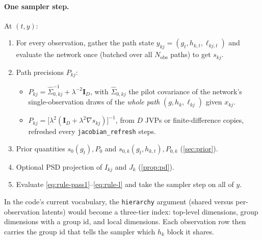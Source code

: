 \documentclass[11pt]{article}
\theoremstyle{definition}
\theoremstyle{remark}
\newcommand{\I}{\mathbf{I}}
\newcommand{\lam}{\lambda}
\newcommand{\arrowm}{\texttt{gauss\_\allowbreak hierarchical}}
\newcommand{\quiver}{\texttt{gauss\_\allowbreak jacobian}}
\newcommand{\hk}{h_k}
\newcommand{\lkj}{\ell_{kj}}
\begin{document}
\paragraph{One sampler step.} At $(t,y)$:
\begin{enumerate}
\item For every observation, gather the path state
 $y_{kj}=(g_t,h_{k,t},\ell_{kj,t})$ and evaluate the network once (batched over
 all $N_\text{obs}$ paths) to get $s_{kj}$.
\item Path precisions $P_{kj}$:
 \begin{itemize}
 \item[\arrowm:] $P_{kj}=\hat\Sigma_{0,kj}^{-1}+\lam^{-2}\I_D$, with
  $\hat\Sigma_{0,kj}$ the pilot covariance of the network's single-observation draws
  of the \emph{whole path} $(g,\hk,\lkj)$ given $x_{kj}$.
 \item[\quiver:] $P_{kj}=\big[\lam^2(\I_D+\lam^2\nabla s_{kj})\big]^{-1}$, from $D$
  JVPs or finite-difference copies, refreshed every \texttt{jacobian\_refresh} steps.
 \end{itemize}
\item Prior quantities $s_0(g_t),P_0$ and $s_{0,k}(g_t,h_{k,t}),P_{0,k}$
 (\cref{sec:prior}).
\item Optional PSD projection of $I_{kj}$ and $J_k$ (\cref{prop:pd}).
\item Evaluate \eqref{eq:rule-pass1}--\eqref{eq:rule-l} and take the sampler step on all of $y$.
\end{enumerate}
In the code's current vocabulary, the \texttt{hierarchy} argument (shared versus
per-observation latents) would become a three-tier index: top-level dimensions,
group dimensions with a group id, and local dimensions. Each observation row then
carries the group id that tells the sampler which $h_k$ block it shares.
\end{document}
